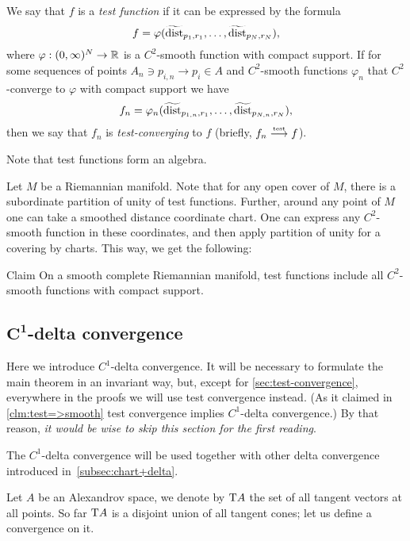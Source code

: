 We say that $f$ is a \emph{test function} if it can be expressed by the formula
$$f=\varphi( \widetilde{\operatorname{\rm dist}}_{p_1,r_1}, \dots,   \widetilde{\operatorname{\rm dist}}_{p_N,r_N}),$$
where $\varphi:(0,\infty)^N\to\mathbb{R}$ is a $C^2$-smooth function with compact support.
If for some sequences of points $A_n\ni p_{i,n}\to p_i\in A$ and $C^2$-smooth functions $\varphi_n$ that $C^2$-converge to $\varphi$ with compact support we have
$$f_n=\varphi_n( \widetilde{\operatorname{\rm dist}}_{p_{1,n},r_1},\dots,   \widetilde{\operatorname{\rm dist}}_{p_{N,n},r_N}),$$
then we say that $f_n$ is \emph{test-converging} to $f$ (briefly, $f_n\zz\testto f$).

Note that test functions form an algebra.

Let $M$ be a Riemannian manifold.
Note that for any open cover of $M$, there is a subordinate partition of unity of test functions.
Further, around any point of $M$ one can take a smoothed distance 
coordinate chart.
One can express any $C^2$-smooth function in these 
coordinates, and then apply partition of unity for a covering by charts.
This way, we get the following:

\begin{thm}{Claim}
On a smooth complete Riemannian manifold, test functions
include all $C^2$-smooth functions with compact support.
\end{thm}


\subsection[\texorpdfstring{$C^1$-delta convergence}{C¹-delta convergence}]%
{$\bm{C^1}$-delta convergence}\label{sec:concept}

Here we introduce $C^1$-delta convergence.
It will be necessary to formulate the main theorem in an invariant way, but, except for \ref{sec:test-convergence}, everywhere in the proofs we will use test convergence instead.
(As it claimed in \ref{clm:test=>smooth} test convergence implies $C^1$-delta convergence.)
By that reason, \textit{it would be wise to skip this section for the first reading}.

The $C^1$-delta convergence will be used together with other delta convergence introduced in~\ref{subsec:chart+delta}.

Let $A$ be an Alexandrov space, we denote by $\mathrm{T} A$ the set of all tangent vectors at all points.
So far $\mathrm{T} A$ is a disjoint union of all tangent cones;
let us define a convergence on it.

